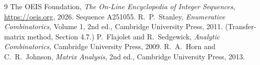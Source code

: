 \documentclass[11pt,a4paper]{article}
\theoremstyle{plain}
\theoremstyle{definition}
\begin{document}
\begin{thebibliography}{9}
 The OEIS Foundation, \emph{The On-Line Encyclopedia of Integer
Sequences}, \url{https://oeis.org}, 2026. Sequence A251055.
 R.~P.~Stanley, \emph{Enumerative Combinatorics}, Volume 1, 2nd ed.,
Cambridge University Press, 2011. (Transfer-matrix method, Section 4.7.)
 P.~Flajolet and R.~Sedgewick, \emph{Analytic Combinatorics}, Cambridge
University Press, 2009.
 R.~A.~Horn and C.~R.~Johnson, \emph{Matrix Analysis}, 2nd ed., Cambridge
University Press, 2013.
\end{thebibliography}
\end{document}
